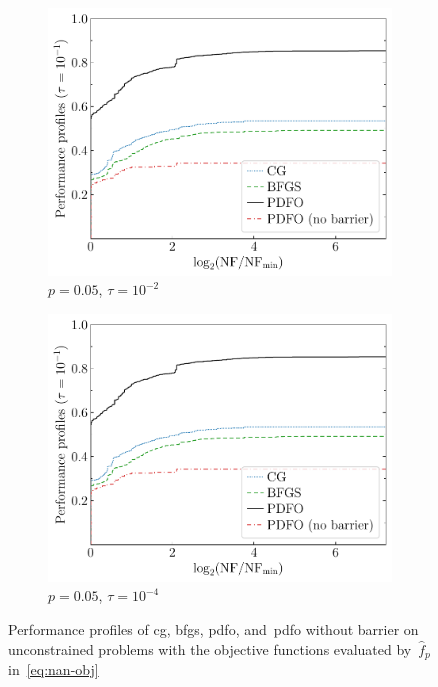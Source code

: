 \documentclass[
    smallextended,  %
    final,          %
]{svjour3}
\newcommand{\obj}{f}
\begin{document}
\begin{figure}[htbp]
\begin{subfigure}{.48\textwidth}
        \centering
        \includegraphics[width=\textwidth,page=2]{perf-nan-bfgs_cg_pdfo-50-10-0.05.pdf}
        \caption{$p = 0.05$, $\tau = 10^{-2}$}
    \end{subfigure}
    \hfill
    \begin{subfigure}{.48\textwidth}
        \centering
        \includegraphics[width=\textwidth,page=4]{perf-nan-bfgs_cg_pdfo-50-10-0.05.pdf}
        \caption{$p = 0.05$, $\tau = 10^{-4}$}
    \end{subfigure}
    \caption{Performance profiles of \gls{cg}, \gls{bfgs}, \gls{pdfo}, and~\gls{pdfo} without
        barrier on unconstrained problems
    with the objective functions evaluated by~$\hat{\obj}_p$ in~\eqref{eq:nan-obj}}
    \label{fig:nan}
\end{figure}
\end{document}
